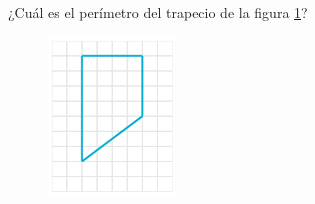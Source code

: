 
¿Cuál es el perímetro del trapecio de la figura \ref{fig:peri_trap_02}?
\begin{figure}[H]
    \begin{center}
        \includegraphics[width=0.3\textwidth]{../images/peri_trap_02.png}
    \end{center}
    \caption{}
    \label{fig:peri_trap_02}
\end{figure}